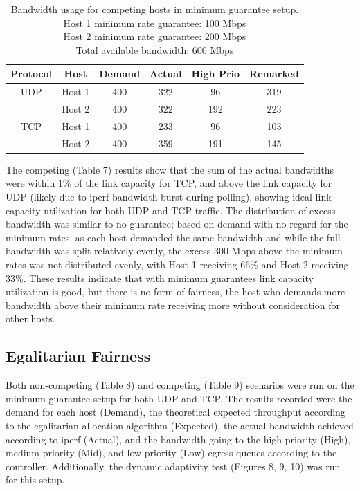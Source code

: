 \documentclass[accepted,single]{gipaper}
\begin{document}
\begin{table}[h]
	\label{mg_c}
	\vspace{-2mm}
	\begin{center}
		\begin{small}
		\setlength\tabcolsep{1.5pt}
			\begin{tabular}{cccccc}
				Protocol & Host & Demand & Actual & High Prio & Remarked \\
				\hline
				UDP & Host 1 & 400 & 322 & 96 & 319\\
				    & Host 2 & 400 & 322 & 192 & 223\\
				\hline
				TCP & Host 1 & 400 & 233 & 96 & 103\\
				    & Host 2 & 400 & 359 & 191 & 145\\
			\end{tabular}
		\end{small}
	\end{center}
	\caption{Bandwidth usage for competing hosts in minimum guarantee setup.\\
	Host 1 minimum rate guarantee: 100 Mbps\\
	Host 2 minimum rate guarantee: 200 Mbps\\	
	Total available bandwidth: 600 Mbps}
	\vspace{-3mm}
\end{table}

The competing (Table 7) results show that the sum of the actual bandwidths were within 1\% of the link capacity for TCP, and above the link capacity for UDP (likely due to iperf bandwidth burst during polling), showing ideal link capacity utilization for both UDP and TCP traffic. The distribution of excess bandwidth was similar to no guarantee; based on demand with no regard for the minimum rates, as each host demanded the same bandwidth and while the full bandwidth was split relatively evenly, the excess 300 Mbps above the minimum rates was not distributed evenly, with Host 1 receiving 66\% and Host 2 receiving 33\%. These results indicate that with minimum guarantees link capacity utilization is good, but there is no form of fairness, the host who demands more bandwidth above their minimum rate receiving more without consideration for other hosts.

\subsection{Egalitarian Fairness}
\label{dba_egal}

Both non-competing (Table 8) and competing (Table 9) scenarios were run on the minimum guarantee setup for both UDP and TCP. The results recorded were the demand for each host (Demand), the theoretical expected throughput according to the egalitarian allocation algorithm (Expected), the actual bandwidth achieved according to iperf (Actual), and the bandwidth going to the high priority (High), medium priority (Mid), and low priority (Low) egress queues according to the controller. Additionally, the dynamic adaptivity test (Figures 8, 9, 10) was run for this setup.
\end{document}
